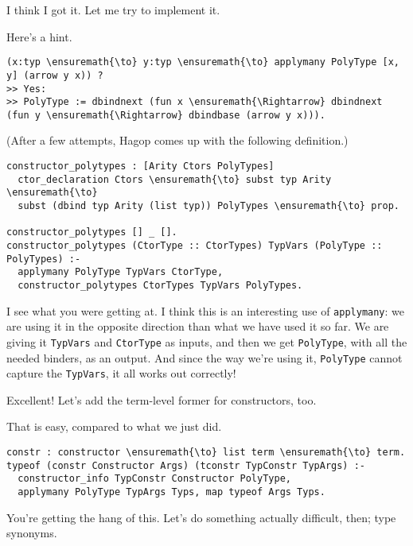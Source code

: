 \heroSTUDENT{} I think I got it. Let me try to implement it.

\heroADVISOR{} Here's a hint.

\begin{verbatim}
(x:typ \ensuremath{\to} y:typ \ensuremath{\to} applymany PolyType [x, y] (arrow y x)) ?
>> Yes:
>> PolyType := dbindnext (fun x \ensuremath{\Rightarrow} dbindnext (fun y \ensuremath{\Rightarrow} dbindbase (arrow y x))).
\end{verbatim}

\begin{scenecomment}
(After a few attempts, Hagop comes up with the following definition.)
\end{scenecomment}

\begin{verbatim}
constructor_polytypes : [Arity Ctors PolyTypes]
  ctor_declaration Ctors \ensuremath{\to} subst typ Arity \ensuremath{\to}
  subst (dbind typ Arity (list typ)) PolyTypes \ensuremath{\to} prop.

constructor_polytypes [] _ [].
constructor_polytypes (CtorType :: CtorTypes) TypVars (PolyType :: PolyTypes) :-
  applymany PolyType TypVars CtorType,
  constructor_polytypes CtorTypes TypVars PolyTypes.
\end{verbatim}

\heroSTUDENT{} I see what you were getting at. I think this is an interesting
use of \texttt{applymany}: we are using it in the opposite direction
than what we have used it so far. We are giving it \texttt{TypVars} and
\texttt{CtorType} as inputs, and then we get \texttt{PolyType}, with all
the needed binders, as an output. And since the way we're using it,
\texttt{PolyType} cannot capture the \texttt{TypVars}, it all works out
correctly!

\heroADVISOR{} Excellent! Let's add the term-level former for constructors,
too.

\heroSTUDENT{} That is easy, compared to what we just did.

\begin{verbatim}
constr : constructor \ensuremath{\to} list term \ensuremath{\to} term.
typeof (constr Constructor Args) (tconstr TypConstr TypArgs) :-
  constructor_info TypConstr Constructor PolyType,
  applymany PolyType TypArgs Typs, map typeof Args Typs.
\end{verbatim}

\heroADVISOR{} You're getting the hang of this. Let's do something actually
difficult, then; type synonyms.
